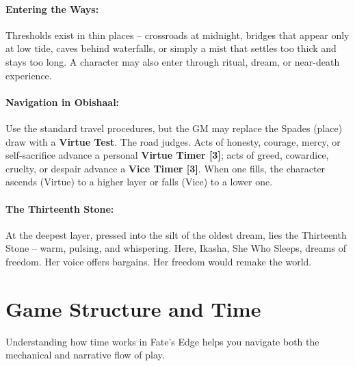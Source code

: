 \paragraph{Entering the Ways:} Thresholds exist in thin places -- crossroads at midnight, bridges that appear only at low tide, caves behind waterfalls, or simply a mist that settles too thick and stays too long. A character may also enter through ritual, dream, or near-death experience.

\paragraph{Navigation in Obishaal:} Use the standard travel procedures, but the GM may replace the Spades (place) draw with a \textbf{Virtue Test}. The road judges. Acts of honesty, courage, mercy, or self-sacrifice advance a personal \textbf{Virtue Timer [3]}; acts of greed, cowardice, cruelty, or despair advance a \textbf{Vice Timer [3]}. When one fills, the character ascends (Virtue) to a higher layer or falls (Vice) to a lower one.

\paragraph{The Thirteenth Stone:} At the deepest layer, pressed into the silt of the oldest dream, lies the Thirteenth Stone -- warm, pulsing, and whispering. Here, Ikasha, She Who Sleeps, dreams of freedom. Her voice offers bargains. Her freedom would remake the world.

\section{Game Structure and Time}
\label{sec:game-structure}

Understanding how time works in Fate's Edge helps you navigate both the mechanical and narrative flow of play.

